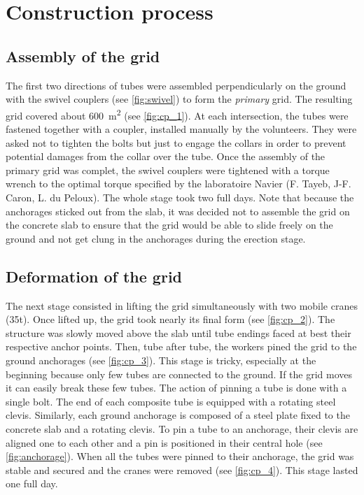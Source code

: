 \pagebreak
\section{Construction process}\label{sec=construction_process}

\subsection{Assembly of the grid}
The first two directions of tubes were assembled perpendicularly on the ground with the swivel couplers (see \cref{fig:swivel}) to form the \emph{primary} grid. The resulting grid covered about 600~m\textsuperscript{2} (see \cref{fig:cp_1}). At each intersection, the tubes were fastened together with a coupler, installed manually by the volunteers. They were asked not to tighten the bolts but just to engage the collars in order to prevent potential damages from the collar over the tube. Once the assembly of the primary grid was complet, the swivel couplers were tightened with a torque wrench to the optimal torque specified by the laboratoire Navier (F. Tayeb, J-F. Caron, L. du Peloux). The whole stage took two full days. Note that because the anchorages sticked out from the slab, it was decided not to assemble the grid on the concrete slab to ensure that the grid would be able to slide freely on the ground and not get clung in the anchorages during the erection stage.

\subsection{Deformation of the grid}
The next stage consisted in lifting the grid simultaneously with two mobile cranes (35t). Once lifted up, the grid took nearly its final form (see \cref{fig:cp_2}). The structure was slowly moved above the slab until tube endings faced at best their respective anchor points. Then, tube after tube, the workers pined the grid to the ground anchorages (see \cref{fig:cp_3}). This stage is tricky, especially at the beginning because only few tubes are connected to the ground. If the grid moves it can easily break these few tubes. The action of pinning a tube is done with a single bolt. The end of each composite tube is equipped with a rotating steel clevis. Similarly, each ground anchorage is composed of a steel plate fixed to the concrete slab and a rotating clevis. To pin a tube to an anchorage, their clevis are aligned one to each other and a pin is positioned in their central hole (see \cref{fig:anchorage}). When all the tubes were pinned to their anchorage, the grid was stable and secured and the cranes were removed (see \cref{fig:cp_4}). This stage lasted one full day.

